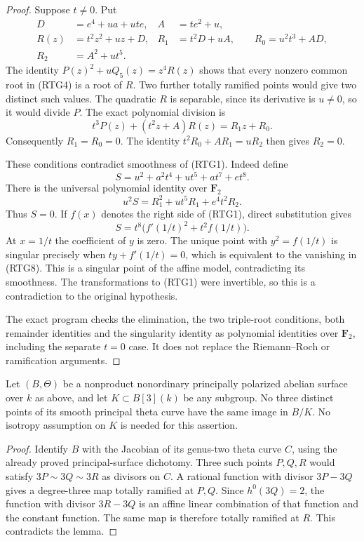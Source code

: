 \begin{proof}
Suppose $t\ne0$. Put
\[
 \begin{split}
 D&=e^4+ua+ute,& A&=te^2+u,\\
 R(z)&=t^2z^2+uz+D,&
 R_1&=t^2D+uA,\qquad R_0=u^2t^3+AD,\\
 R_2&=A^2+ut^5.
 \end{split}                                         \tag{RTG5}
\]
The identity $P(z)^2+uQ_5(z)=z^4R(z)$ shows that every
nonzero common root in (RTG4) is a root of $R$.
Two further totally ramified points would give two distinct such
values. The quadratic $R$ is separable, since its derivative is
$u\ne0$, so it would divide $P$. The exact polynomial division is
\[
              t^3P(z)+(t^2z+A)R(z)=R_1z+R_0.
                                                               \tag{RTG6}
\]
Consequently $R_1=R_0=0$. The identity
$t^2R_0+AR_1=uR_2$ then gives $R_2=0$.

These conditions contradict smoothness of (RTG1). Indeed define
\[
                  S=u^2+a^2t^4+ut^5+at^7+et^8.
\]
There is the universal polynomial identity over $\mathbf F_2$
\[
                  u^2S=R_1^2+ut^5R_1+e^4t^2R_2.       \tag{RTG7}
\]
Thus $S=0$. If $f(x)$ denotes the right side of (RTG1), direct
substitution gives
\[
          S=t^8\bigl(f'(1/t)^2+t^2 f(1/t)\bigr).       \tag{RTG8}
\]
At $x=1/t$ the coefficient of $y$ is zero. The unique point with
$y^2=f(1/t)$ is singular precisely when
$ty+f'(1/t)=0$, which is equivalent to the vanishing in (RTG8).
This is a singular point of the affine model, contradicting its
smoothness. The transformations to (RTG1) were invertible, so this
is a contradiction to the original hypothesis.

The exact program
checks the elimination, the two triple-root conditions, both
remainder identities and the singularity identity as polynomial
identities over $\mathbf F_2$, including the separate $t=0$ case.
It does not replace the Riemann--Roch or ramification arguments.
\end{proof}

\begin{corollary}
\label{cor:root-nonordinary-theta-no-three-triples-candidate}
Let $(B,\Theta)$ be a nonproduct nonordinary principally polarized
abelian surface over $k$ as above, and let $K\subset B[3](k)$ be
any subgroup. No three distinct points of its smooth principal
theta curve have the same image in $B/K$. No isotropy assumption
on $K$ is needed for this assertion.
\end{corollary}
\begin{proof}
Identify $B$ with the Jacobian of its genus-two theta curve $C$,
using the already proved principal-surface dichotomy. Three such
points $P,Q,R$ would satisfy
$3P\sim3Q\sim3R$ as divisors on $C$. A rational function with
divisor $3P-3Q$ gives a degree-three map totally ramified at
$P,Q$. Since $h^0(3Q)=2$, the function with divisor $3R-3Q$
is an affine linear combination of that function and the constant
function. The same map is therefore totally ramified at $R$.
This contradicts the lemma.
\end{proof}

